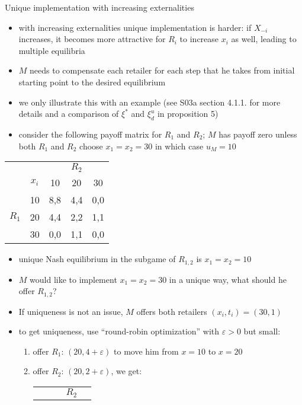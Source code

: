 \documentclass[11pt,english]{beamer}
\newcommand{\ve}{\varepsilon}
\begin{document}
\begin{frame}[allowframebreaks]{Unique implementation with increasing externalities}
  \begin{itemize}
  \item with increasing externalities unique implementation is harder:
    if $X_{-i}$ increases, it becomes more attractive for $R_i$ to
    increase $x_i$ as well, leading to multiple equilibria
  \item $M$ needs to compensate each retailer for each step that he
    takes from initial starting point to the desired equilibrium
  \item we only illustrate this with an example (see S03a section
    4.1.1. for more details and a comparison of $\xi^*$ and $\xi^u_d$
    in proposition 5)
  \item consider the following payoff matrix for $R_1$ and $R_2$; $M$
    has payoff zero unless both $R_1$ and $R_2$ choose $x_1=x_2=30$ in
    which case $u_M =10$
  \end{itemize}
  \begin{table}[c]
    \centering
    \begin{tabular}{cc|ccc}
      & & & $R_2$ & \\
      &$x_i$  & 10 & 20 & 30 \\ \hline
      & 10 & 8,8 & 4,4 & 0,0 \\
      $R_1$ & 20 & 4,4 &2,2 &1,1 \\
      & 30 & 0,0 & 1,1 & 0,0
    \end{tabular}
  \end{table}
  \begin{itemize}
  \item unique Nash equilibrium in the subgame of $R_{1,2}$ is
    $x_1=x_2=10$
  \item $M$ would like to implement $x_1=x_2=30$ in a unique way, what
    should he offer $R_{1,2}$?
  \item If uniqueness is not an issue, $M$ offers both retailers $(x_i,t_i)=(30,1)$
  \item to get uniqueness, use ``round-robin optimization'' with $\ve
    >0$ but small:
    \begin{enumerate}
    \item offer $R_1$: $(20,4+\ve)$ to move him from $x=10$ to $x=20$
    \item offer $R_2$: $(20,2+\ve)$, we get:
  \begin{table}[c]
    \centering
    \begin{tabular}{cc|ccc}
      & & & $R_2$ & \\

\end{tabular}
\end{table}
\end{enumerate}
\end{itemize}
\end{frame}
\end{document}
